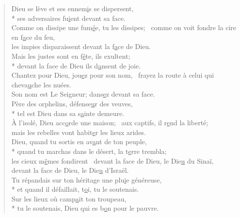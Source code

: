 
\begin{verse}
Dieu se lève et ses ennem\underline{i}s se dispersent, \\*
ses adversaires fu\underline{i}ent devant sa face. \\
Comme on dissipe une fum\underline{é}e, tu les dissipes;~\psalmdagger
comme on voit fondre la cire en f\underline{a}ce du feu, \\
les impies disparaissent devant la f\underline{a}ce de Dieu. \\

Mais les justes sont en f\underline{ê}te, ils exultent; \\*
devant la face de Dieu ils d\underline{a}nsent de joie. \\
Chantez pour Dieu, jou\underline{e}z pour son nom,~\psalmdagger
frayez la route à celui qui cheva\underline{u}che les nuées. \\
Son nom est Le Seigneur; dans\underline{e}z devant sa face. \\

Père des orphelins, défense\underline{u}r des veuves, \\*
tel est Dieu dans sa s\underline{a}inte demeure. \\
À l’isolé, Dieu acc\underline{o}rde une maison;~\psalmdagger
aux captifs, il r\underline{e}nd la liberté; \\
mais les rebelles vont habit\underline{e}r les lieux arides. \\

Dieu, quand tu sortis en av\underline{a}nt de ton peuple, \\*
quand tu marchas dans le désert, la t\underline{e}rre trembla; \\
les cieux m\underline{ê}mes fondirent~\psalmdagger
devant la face de Dieu, le Die\underline{u} du Sinaï, \\
devant la face de Dieu, le Die\underline{u} d’Israël. \\

Tu répandais sur ton héritage une plu\underline{i}e généreuse, \\*
et quand il défaillait, t\underline{o}i, tu le soutenais. \\
Sur les lieux où camp\underline{a}it ton troupeau, \\*
tu le soutenais, Dieu qui es b\underline{o}n pour le pauvre. \\


\end{verse}
